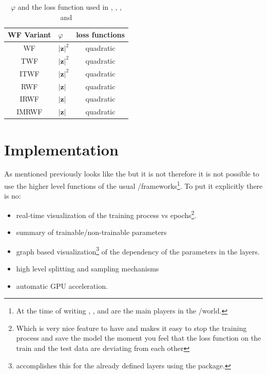 \begin{table}
	\centering
	\begin{tabular}{||c l c||} 
	 \hline
	 \ac{WF} Variant & $\varphi$ 						& loss functions\\ [0.5ex] 
	 \hline\hline
	 \ac{WF}\index{WF}                & $\left|\boldsymbol{z}\right|^2$ 	& quadratic 	\\
	 \ac{TWF}\index{TWF}   & $\left|\boldsymbol{z}\right|^2$ 	& quadratic 	\\
	 \ac{ITWF}\index{ITWF}  & $\left|\boldsymbol{z}\right|^2$   & quadratic 	\\
	 \ac{RWF}\index{RWF}  & $\left|\boldsymbol{z}\right|$ 	& quadratic 	\\
	 \ac{IRWF}\index{IRWF}   & $\left|\boldsymbol{z}\right|$ 	& quadratic 	\\
	 \ac{IMRWF}\index{IMRWF}   & $\left|\boldsymbol{z}\right|$ 	& quadratic 	\\ [1ex]
	 \hline
	\end{tabular}
	\caption{$\varphi$ and the loss function used in \cite{Candes2014}, \cite{Chen2015}, \cite{Kolte2016}, and \cite{Zhang2016}}
	\label{tab:formulation}
	\end{table}


\section{Implementation}

As mentioned previously \du looks like the \rnns but it is not therefore it is not possible to use the higher level functions of the usual 
\ml/\dl frameworks\footnote{At the time of writing \tensorflow\cite{Abadi2016}, \keras\cite{Chollet2023}, and \pytorch\cite{Paszke2019} are the 
main players in the \ml/\dl world.}. To put it explicitly there is no:
\begin{itemize}
	\item real-time visualization of the training process vs epochs\footnote{Which is very nice feature to have and makes it easy to stop the training process 
  and save the 
  model the moment you feel that the loss function on the train and the test data are deviating from each other}.
  \item summary of trainable/non-trainable parameters
	\item graph based visualization\footnote{\tensorflow accomplishes this for the already defined layers using the \graphviz package.} of the dependency of the parameters in the layers.
	\item high level splitting and sampling mechanisms
	\item automatic \ac{GPU} acceleration. 
\end{itemize}

